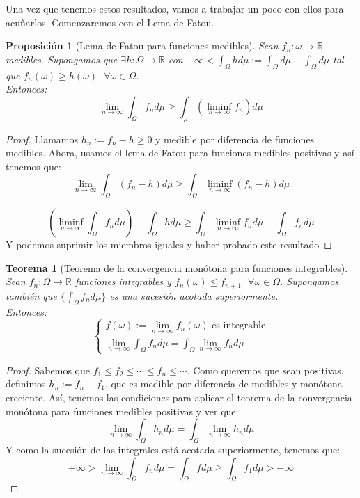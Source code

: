 \documentclass[11pt, a4paper]{article}
\newcommand{\R}{\mathbb{R}}
\theoremstyle{theorem-style}
\newtheorem{nth}{Teorema}[section]
\newtheorem{nprop}{Proposición}[section]
\theoremstyle{definition-style}
\theoremstyle{remark-style}
\theoremstyle{example-style}
\begin{document}
Una vez que tenemos estos resultados, vamos a trabajar un poco con ellos para acuñarlos. Comenzaremos con el Lema de Fatou.

\begin{nprop}[Lema de Fatou para funciones medibles]
  Sean $f_n: \omega \to \R$ medibles. Supongamos que $\exists h: \Omega \to \R$ con $-\infty < \int_\Omega h d\mu := \int_\Omega d\mu - \int_\Omega d\mu $ tal que $f_n(\omega) \geq h(\omega) \ \ \ \forall \omega \in \Omega$.\\
  Entonces:
  $$ \lim_{n\to \infty}\int_\Omega f_n d\mu \geq \int_\mu (\liminf_{n\to \infty}f_n )d\mu$$
\end{nprop}
\begin{proof}
  Llamamos $h_n:= f_n - h \geq 0$ y medible por diferencia de funciones medibles. Ahora, usamos el lema de Fatou para funciones medibles positivas y así tenemos que:
  $$ \lim_{n\to \infty} \int_\Omega (f_n -h) d\mu \geq \int_\Omega \liminf_{n\to \infty}(f_n - h) d\mu$$
  
  $$ ( \liminf_{n\to \infty}\int_\Omega f_n d\mu )  - \int_\Omega h d\mu \geq \int_\Omega \liminf_{n\to \infty} f_n d\mu - \int_\Omega f_n d\mu$$
  Y podemos suprimir los miembros iguales y haber probado este resultado
\end{proof} 

\begin{nth}[Teorema de la convergencia monótona para funciones integrables]
  Sean $f_n: \Omega \to \R$ funciones integrables y $f_n(\omega) \leq f_{n+1} \ \ \ \forall \omega \in \Omega$. Supongamos también que $\{\int_\Omega f_n d\mu\}$ es una sucesión acotada superiormente.\\
  Entonces:
  $$ \begin{cases}
    f(\omega):= \lim_{n\to \infty}f_n(\omega) \text{ es integrable}\\
    \lim_{n \to \infty} \int_\Omega f_n d\mu = \int_{\Omega}\lim_{n\to \infty} f_n d\mu
  \end{cases}$$
  
\end{nth}
\begin{proof}
  Sabemos que $f_1 \leq f_2 \leq \cdots \leq f_n \leq \cdots $. Como queremos que sean positivas, definimos $h_n:= f_n - f_1$, que es medible por diferencia de medibles y monótona creciente. Así, tenemos las condiciones para aplicar el teorema de la convergencia monótona para funciones medibles positivas y ver que:
  $$ \lim_{n \to \infty} \int_\Omega h_n d\mu = \int_\Omega \lim_{n \to \infty}h_n d\mu$$
  Y como la sucesión de las integrales está acotada superiormente, tenemos que:
  $$ +\infty > \lim_{n\to \infty} \int_\Omega f_n d\mu = \int_\Omega f d\mu \geq \int_\Omega f_1 d\mu > -\infty$$
\end{proof}
\end{document}
